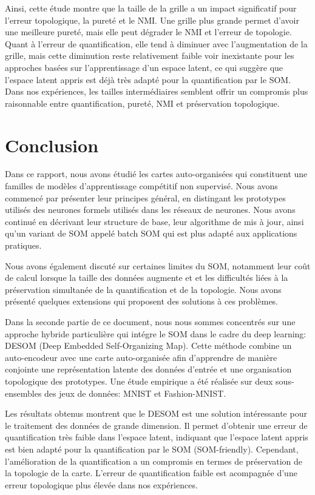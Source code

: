 \documentclass[12pt,a4paper]{report}
\begin{document}
Ainsi, cette étude montre que la taille de la grille a un impact significatif pour l'erreur topologique, la pureté et le NMI.
Une grille plus grande permet d'avoir une meilleure pureté, mais elle peut dégrader le NMI et l'erreur de topologie.
Quant à l'erreur de quantification, elle tend à diminuer avec l'augmentation de la grille, mais cette diminution reste relativement faible voir inexistante 
pour les approches basées sur l'apprentissage d'un espace latent, ce qui suggère que l'espace latent appris est déjà très adapté pour la quantification par le SOM.
Dans nos expériences, les tailles intermédiaires semblent offrir un compromis plus raisonnable entre quantification, pureté, NMI et préservation topologique. 


\chapter{Conclusion}
 
Dans ce rapport, nous avons étudié les cartes auto-organisées qui constituent une familles de modèles d'apprentissage 
compétitif non supervisé. Nous avons commencé par présenter leur principes général, en distingant les
prototypes utilisés des neurones formels utilisés dans les réseaux de neurones. Nous avons continué 
en décrivant leur structure de base, leur algorithme de mis à jour, ainsi qu'un variant de SOM appelé batch SOM qui est plus adapté aux applications
pratiques.

Nous avons également discuté sur certaines limites du SOM, notamment leur coût de calcul lorsque la taille des données augmente et
et les difficultés liées à la préservation simultanée de la quantification et de la topologie. Nous avons présenté 
quelques extensions qui proposent des solutions à ces problèmes.

Dans la seconde partie de ce document, nous nous sommes concentrés sur une approche hybride particulière qui intégre le SOM dans le cadre
du deep learning: DESOM (Deep Embedded Self-Organizing Map). Cette méthode combine un auto-encodeur avec une carte auto-organisée afin d'apprendre 
de manière conjointe une représentation latente des données d'entrée et une organisation topologique des prototypes.
Une étude empirique a été réalisée sur deux sous-ensembles des jeux de données: MNIST et Fashion-MNIST.

Les résultats obtenus montrent que le DESOM est une solution intéressante pour le traitement des données de grande dimension.
Il permet d'obtenir une erreur de quantification très faible dans l'espace latent, indiquant que l'espace latent appris est bien adapté pour la quantification par le SOM (SOM-friendly).
Cependant, l'amélioration de la quantification a un compromis en termes de préservation de la topologie de la carte. L'erreur de quantification faible est acompagnée
d'une erreur topologique plus élevée dans nos expériences.
\end{document}
